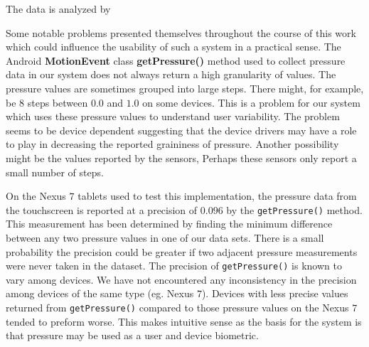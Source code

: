 %




The data is analyzed by 

Some notable problems presented themselves
throughout the course of this work
which could influence the usability of such a 
system in a practical sense.
%
The Android \textbf{MotionEvent} class \textbf{getPressure()} method
used to collect pressure data in our system
does not always return a high granularity of values.
The pressure values are sometimes grouped
into large steps.
There might, for example,
be $8$ steps between $0.0$ and $1.0$ on some devices.
This is a problem for our system which uses
these pressure values to understand user variability.
%
The problem seems to be device dependent
suggesting that the device drivers may have a role to play
in decreasing the reported graininess of pressure.
Another possibility might be the values
reported by the sensors,
Perhaps these sensors only report a small number of steps.

On the Nexus $7$ tablets used to test this implementation,
the pressure data from the touchscreen is 
reported at a precision of $0.096$ by the {\tt getPressure()} method.
This measurement has been determined
by finding the minimum difference between
any two pressure values in one of our data sets.
%
There is a small probability the precision could
be greater if two adjacent pressure measurements
were never taken in the dataset.
%
The precision of {\tt getPressure()} is
known to vary among devices.
We have not encountered any inconsistency
in the precision among devices of the same type (eg. Nexus $7$).
%
Devices with less precise values returned from
{\tt getPressure()}
compared to those pressure values on the Nexus $7$
tended to preform worse.
%
This makes intuitive sense as the basis for the system
is that pressure may be used as a user and device biometric.

